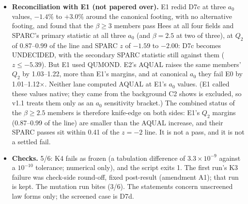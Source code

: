 \documentclass[10pt]{article}
\begin{document}
\begin{itemize}
\item \textbf{Reconciliation with E1 (not papered over).} E1 redid D7c at three $a_0$ values, $-1.4\%$ to $+3.0\%$ around the canonical footing, with no alternative footing, and found that the $\beta\ge3$ members pass Hees at all four fields and SPARC's primary statistic at all three $a_0$ (and $\beta=2.5$ at two of three), at $Q_2$ of 0.87--0.99 of the line and SPARC $z$ of $-1.59$ to $-2.00$: D7c becomes UNDECIDED, with the secondary SPARC statistic still against them ($z\le-5.39$). But E1 used QUMOND. E2's AQUAL raises the same members' $Q_2$ by 1.03--1.22, more than E1's margins, and at canonical $a_0$ they fail E0 by 1.01--1.12$\times$. Neither lane computed AQUAL at E1's $a_0$ values. (E1 called these values native; they came from the background C2 shows is excluded, so v1.1 treats them only as an $a_0$ sensitivity bracket.) The combined status of the $\beta\ge2.5$ members is therefore knife-edge on both sides: E1's $Q_2$ margins (0.87--0.99 of the line) are smaller than the AQUAL increase, and their SPARC passes sit within 0.41 of the $z=-2$ line. It is not a pass, and it is not a settled fail.
\item \textbf{Checks.} 5/6: K4 fails as frozen (a tabulation difference of $3.3\times10^{-9}$ against a $10^{-10}$ tolerance; numerical only), and the script exits 1. The first run's K3 failure was check-side round-off, fixed post-result (amendment A1); that run is kept. The mutation run bites (3/6). The statements concern unscreened law forms only; the screened case is D7d.
\end{itemize}
\end{document}
